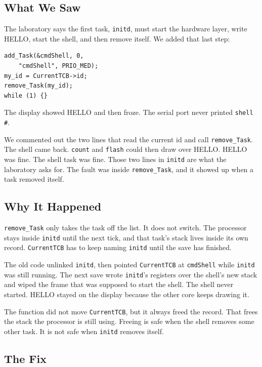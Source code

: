\documentclass[conference,a4paper]{IEEEtran}
\begin{document}
\subsection{What We Saw}

The laboratory says the first task, \texttt{initd}, must start the hardware layer, write HELLO, start the shell, and then remove itself. We added that last step:

\noindent\begin{minipage}{\columnwidth}
\begin{verbatim}
add_Task(&cmdShell, 0,
    "cmdShell", PRIO_MED);
my_id = CurrentTCB->id;
remove_Task(my_id);
while (1) {}
\end{verbatim}
\end{minipage}

The display showed HELLO and then froze. The serial port never printed \texttt{shell \#}.

We commented out the two lines that read the current id and call \texttt{remove\_Task}. The shell came back. \texttt{count} and \texttt{flash} could then draw over HELLO. HELLO was fine. The shell task was fine. Those two lines in \texttt{initd} are what the laboratory asks for. The fault was inside \texttt{remove\_Task}, and it showed up when a task removed itself.

\subsection{Why It Happened}

\texttt{remove\_Task} only takes the task off the list. It does not switch. The processor stays inside \texttt{initd} until the next tick, and that task's stack lives inside its own record. \texttt{CurrentTCB} has to keep naming \texttt{initd} until the save has finished.

The old code unlinked \texttt{initd}, then pointed \texttt{CurrentTCB} at \texttt{cmdShell} while \texttt{initd} was still running. The next save wrote \texttt{initd}'s registers over the shell's new stack and wiped the frame that was supposed to start the shell. The shell never started. HELLO stayed on the display because the other core keeps drawing it.

The function did not move \texttt{CurrentTCB}, but it always freed the record. That frees the stack the processor is still using. Freeing is safe when the shell removes some other task. It is not safe when \texttt{initd} removes itself.

\subsection{The Fix}
\end{document}
